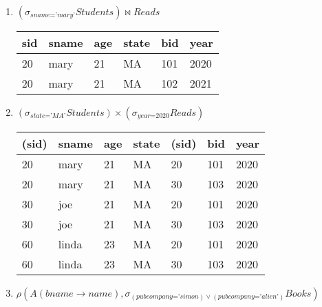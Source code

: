 \documentclass[letterpaper, 11pt]{article}
\begin{document}
\begin{enumerate}[label={\alph*}),leftmargin=*]
    \item $(\sigma_{\textit{sname='mary'}}\textit{Students}) \bowtie \textit{Reads}$
    \begin{table}[H]
        \centering
        \begin{tabular}{|l|l|l|l|l|l|}
            \hline
            \cellcolor[HTML]{b4c6e7} sid & \cellcolor[HTML]{b4c6e7} sname & \cellcolor[HTML]{b4c6e7} age & \cellcolor[HTML]{b4c6e7} state & \cellcolor[HTML]{b4c6e7} bid & \cellcolor[HTML]{b4c6e7} year \\
            \hline
            20 & mary & 21 & MA & 101 & 2020 \\
            \hline
            20 & mary & 21 & MA & 102 & 2021 \\
            \hline
        \end{tabular}
    \end{table}
    \item $(\sigma_{\textit{state='MA'}}\textit{Students}) \times (\sigma_{\textit{year=2020}}\textit{Reads})$
    \begin{table}[H]
        \centering
        \begin{tabular}{|l|l|l|l|l|l|l|}
        \hline
            \cellcolor[HTML]{b4c6e7} (sid) & \cellcolor[HTML]{b4c6e7} sname & \cellcolor[HTML]{b4c6e7} age & \cellcolor[HTML]{b4c6e7} state & \cellcolor[HTML]{b4c6e7} (sid) & \cellcolor[HTML]{b4c6e7} bid & \cellcolor[HTML]{b4c6e7} year \\
            \hline
            20 & mary & 21 & MA & 20 & 101 & 2020 \\
            \hline
            20 & mary & 21 & MA & 30 & 103 & 2020 \\
            \hline
            30 & joe & 21 & MA & 20 & 101 & 2020 \\
            \hline
            30 & joe & 21 & MA & 30 & 103 & 2020 \\
            \hline
            60 & linda & 23 & MA & 20 & 101 & 2020 \\
            \hline
            60 & linda & 23 & MA & 30 & 103 & 2020 \\
            \hline
        \end{tabular}
    \end{table}
    \item $\rho(A(\textit{bname} \to \textit{name}), \sigma_{(\textit{pubcompany='simon})\vee (\textit{pubcompany='alien'})} \textit{Books})$
    \begin{table}[H]
        \centering
        \begin{tabular}{|l|l|l|l|l|}

\end{tabular}
\end{table}
\end{enumerate}
\end{document}
